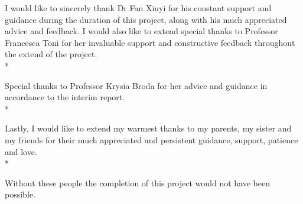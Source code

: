 I would like to sincerely thank Dr Fan Xiuyi for his constant support and guidance during the duration of this project, along with his much appreciated advice and feedback. I would also like to extend special thanks to Professor Francesca Toni for her invaluable support and constructive feedback throughout the extend of the project.
\\*

Special thanks to Professor Krysia Broda for her advice and guidance in accordance to the interim report.
\\*

Lastly, I would like to extend my warmest thanks to my parents, my sister and my friends for their much appreciated and persistent guidance, support, patience and love.
\\*

Without these people the completion of this project would not have been possible.